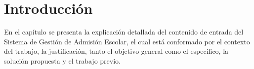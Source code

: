 \chapter{Introducci\'on}
En el capítulo se presenta la explicación detallada del contenido de entrada  del Sistema de Gestión de Admisión Escolar, el cual está conformado por el contexto del trabajo, la justificación, tanto el objetivo general como el especifico, la solución propuesta y el trabajo previo.






